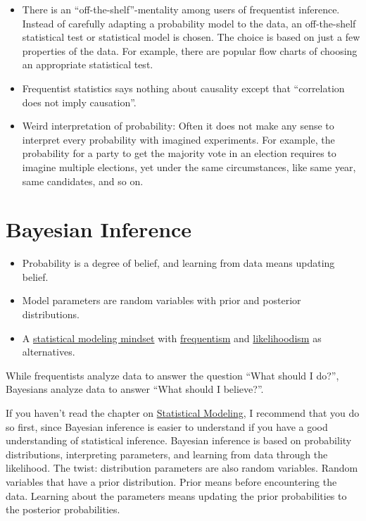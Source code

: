 \documentclass[
  10pt,
]{scrbook}
\providecommand{\tightlist}{%
  \setlength{\itemsep}{0pt}\setlength{\parskip}{0pt}}
\begin{document}
\begin{itemize}
\item
  There is an ``off-the-shelf''-mentality among users of frequentist inference. Instead of carefully adapting a probability model to the data, an off-the-shelf statistical test or statistical model is chosen. The choice is based on just a few properties of the data. For example, there are popular flow charts of choosing an appropriate statistical test.
\item
  Frequentist statistics says nothing about causality except that ``correlation does not imply causation''.
\item
  Weird interpretation of probability: Often it does not make any sense to interpret every probability with imagined experiments. For example, the probability for a party to get the majority vote in an election requires to imagine multiple elections, yet under the same circumstances, like same year, same candidates, and so on.
\end{itemize}

\hypertarget{bayesian-inference}{%
\chapter{Bayesian Inference}\label{bayesian-inference}}

\begin{itemize}
\tightlist
\item
  Probability is a degree of belief, and learning from data means updating belief.
\item
  Model parameters are random variables with prior and posterior distributions.
\item
  A \protect\hyperlink{statistical-modeling}{statistical modeling mindset} with \protect\hyperlink{frequentist-inference}{frequentism} and \protect\hyperlink{likelihoodism}{likelihoodism} as alternatives.
\end{itemize}

While frequentists analyze data to answer the question ``What should I do?'', Bayesians analyze data to answer ``What should I believe?''.

If you haven't read the chapter on \protect\hyperlink{statistical-modeling}{Statistical Modeling}, I recommend that you do so first, since Bayesian inference is easier to understand if you have a good understanding of statistical inference.
Bayesian inference is based on probability distributions, interpreting parameters, and learning from data through the likelihood.
The twist: distribution parameters are also random variables.
Random variables that have a prior distribution.
Prior means before encountering the data.
Learning about the parameters means updating the prior probabilities to the posterior probabilities.
\end{document}
